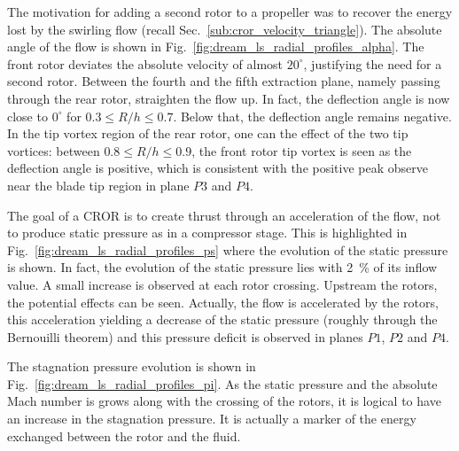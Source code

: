 The motivation for adding a second rotor to a propeller
was to recover the energy lost by the swirling flow
(recall Sec.~\ref{sub:cror_velocity_triangle}).
The absolute angle of the flow is shown in 
Fig.~\ref{fig:dream_ls_radial_profiles_alpha}. The front rotor
deviates the absolute velocity of almost $20^\circ$, justifying the need
for a second rotor. Between the fourth and the fifth extraction plane, namely
passing through the rear rotor, straighten the flow up. In fact,
the deflection angle is now close to $0^\circ$ for $0.3 \leq R/h \leq 0.7$.
Below that, the deflection angle remains negative. In the tip vortex region
of the rear rotor, one can the effect of the two tip vortices: between 
$0.8 \leq R/h \leq 0.9$, the front rotor tip vortex is seen as the 
deflection angle is positive, which is consistent with the positive
peak observe near the blade tip region in plane $P3$ and $P4$.

The goal of a CROR is to create thrust through an acceleration of 
the flow, not to produce static pressure as in a compressor stage.
This is highlighted in Fig.~\ref{fig:dream_ls_radial_profiles_ps}
where the evolution of the static pressure is shown.
In fact, the evolution of the static pressure lies with 2~\%
of its inflow value. A small increase is observed at each
rotor crossing. Upstream the rotors, the potential effects can
be seen. Actually, the flow is accelerated by the rotors, this acceleration
yielding a decrease of the static pressure 
(roughly through the Bernouilli theorem) and this pressure deficit is observed in
planes $P1$, $P2$ and $P4$.

The stagnation pressure evolution is shown in 
Fig.~\ref{fig:dream_ls_radial_profiles_pi}. As the static pressure
and the absolute Mach number is grows along with the crossing of the rotors,
it is logical to have an increase in the stagnation pressure.
It is actually a marker of the energy exchanged between the rotor
and the fluid.

